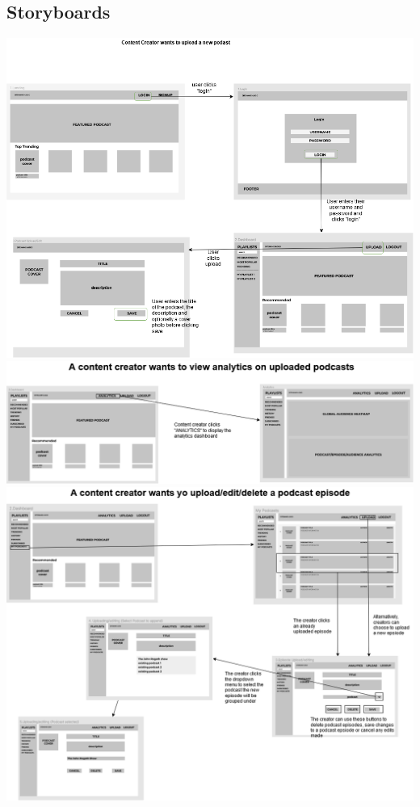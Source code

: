 \documentclass[12pt]{article}
\begin{document}
\begin{appendices}
\section{Storyboards}\label{app:storyboards}
\begin{center}
    \includegraphics[width=\textwidth]{resources/uploading_podcasts}
    \includegraphics[width=\textwidth]{resources/analytics}
    \includegraphics[width=\textwidth]{resources/upload_edit_delete}


\end{center}
\end{appendices}
\end{document}
